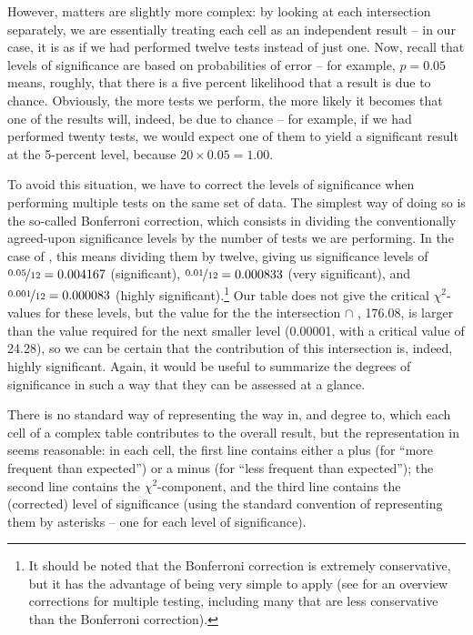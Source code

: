 However, matters are slightly more complex: by looking at each intersection separately, we are essentially treating each cell as an independent result -- in our case, it is as if we had performed twelve tests instead of just one. Now, recall that levels of significance  are based on probabilities  of error -- for example, $p = 0.05$ means, roughly, that there is a five percent likelihood that a result is due to chance.  Obviously, the more tests we perform, the more likely it becomes that one of the results will, indeed, be due to chance  -- for example, if we had performed twenty tests, we would expect one of them to yield a significant result at the 5\hyp{}percent level, because $20 \times 0.05 = 1.00$.

To avoid this situation, we have to correct the levels of significance when performing multiple tests on the same set of data. The simplest way of doing so is the so\hyp{}called Bonferroni  correction, which consists in dividing the conventionally agreed\hyp{}upon significance levels by the number of tests we are performing. In the case of , this means dividing them by twelve, giving us significance  levels of $\nicefrac{0.05}{12} = 0.004167$ (significant), $\nicefrac{0.01}{12} = 0.000833$ (very significant), and $\nicefrac{0.001}{12} = 0.000083$ (highly significant).\footnote{It should be noted that the Bonferroni  correction is extremely conservative, but it has the advantage of being very simple to apply (see \citealt{shaffer_multiple_1995} for an overview corrections for multiple testing, including many that are less conservative than the Bonferroni correction).} Our table does not give the critical $\chi^2$-values  for these levels, but the value for the the intersection   $\cap$ ,  176.08, is larger than the value required for the next smaller level (0.00001, with a critical value of 24.28), so we can be certain that the contribution of this intersection is, indeed, highly significant.  Again, it would be useful to summarize the degrees of significance in such a way that they can be assessed at a glance.

There is no standard way of representing the way in, and degree to, which each cell of a complex table contributes to the overall result, but the representation in  seems reasonable: in each cell, the first line contains either a plus (for ``more frequent than expected'')  or a minus (for ``less frequent than expected''); the second line contains the $\chi^2$-component,  and the third line contains the (corrected) level of significance  (using the standard convention of representing them by asterisks -- one for each level of significance).

